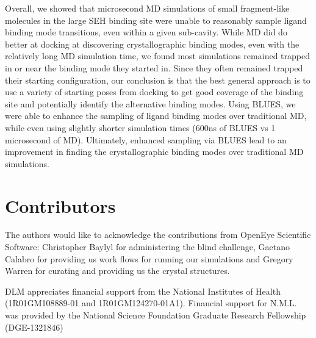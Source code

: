 Overall, we showed that microsecond MD simulations of small fragment-like molecules in the large SEH binding site were unable to reasonably sample ligand binding mode transitions, even within a given sub-cavity.
While MD did do better at docking at discovering crystallographic binding modes, even with the relatively long MD simulation time, we found most simulations remained trapped in or near the binding mode they started in.
Since they often remained trapped their starting configuration, our conclusion is that the best general approach is to use a variety of starting poses from docking to get good coverage of the binding site and potentially identify the alternative binding modes.
Using BLUES, we were able to enhance the sampling of ligand binding modes over traditional MD, while even using slightly shorter simulation times (600ns of BLUES vs 1 microsecond of MD).
Ultimately, enhanced sampling via BLUES lead to an improvement in finding the crystallographic binding modes over traditional MD simulations.

\section{Contributors}
The authors would like to acknowledge the contributions from OpenEye Scientific Software: Christopher Baylyl for administering the blind challenge, Gaetano Calabro for providing us work flows for running our simulations and Gregory Warren for curating and providing us the crystal structures.

DLM appreciates financial support from the National Institutes of Health (1R01GM108889-01 and 1R01GM124270-01A1). Financial support for N.M.L. was provided by the National Science Foundation Graduate Research Fellowship (DGE-1321846)
